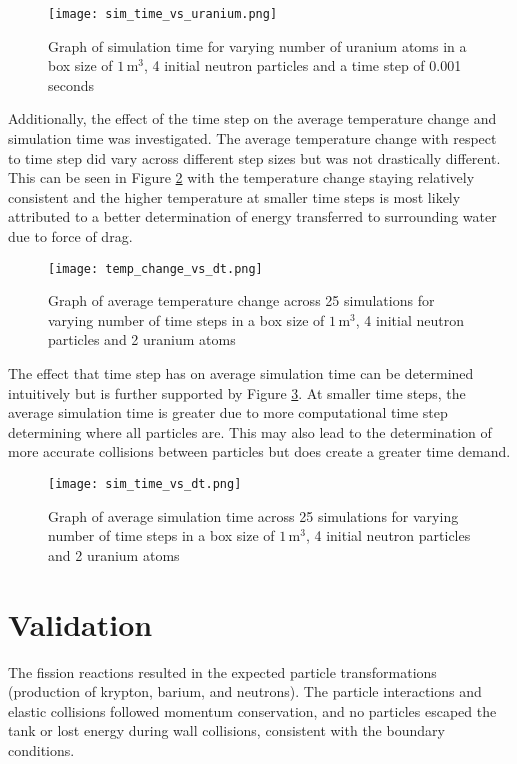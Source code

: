 \documentclass[twocolumn, 11pt]{article}
\begin{document}
\begin{figure}[h]
    \centering
    \texttt{[image: sim\_time\_vs\_uranium.png]}
    \caption{Graph of simulation time for varying number of uranium atoms in a box size of \(1 \,\text{m}^3\), 4 initial neutron particles and a time step of 0.001 seconds}
    \label{fig:uranium_time_analysis}
\end{figure}

Additionally, the effect of the time step on the average temperature change and simulation time was investigated. The average temperature change with respect to time step did vary across different step sizes but was not drastically different. This can be seen in Figure \ref{fig:temp_dt_analysis} with the temperature change staying relatively consistent and the higher temperature at smaller time steps is most likely attributed to a better determination of energy transferred to surrounding water due to force of drag. 

\begin{figure}[h]
    \centering
    \texttt{[image: temp\_change\_vs\_dt.png]}
    \caption{Graph of average temperature change across 25 simulations for varying number of time steps in a box size of \(1 \,\text{m}^3\), 4 initial neutron particles and 2 uranium atoms}
    \label{fig:temp_dt_analysis}
\end{figure}

The effect that time step has on average simulation time can be determined intuitively but is further supported by Figure \ref{fig:time_dt_analysis}. At smaller time steps, the average simulation time is greater due to more computational time step determining where all particles are. This may also lead to the determination of more accurate collisions between particles but does create a greater time demand. 

\begin{figure}[h]
    \centering
    \texttt{[image: sim\_time\_vs\_dt.png]}
    \caption{Graph of average simulation time across 25 simulations for varying number of time steps in a box size of \(1 \,\text{m}^3\), 4 initial neutron particles and 2 uranium atoms}
    \label{fig:time_dt_analysis}
\end{figure}

\section*{Validation}
The fission reactions resulted in the expected particle transformations (production of krypton, barium, and neutrons). The particle interactions and elastic collisions followed momentum conservation, and no particles escaped the tank or lost energy during wall collisions, consistent with the boundary conditions.
\end{document}
